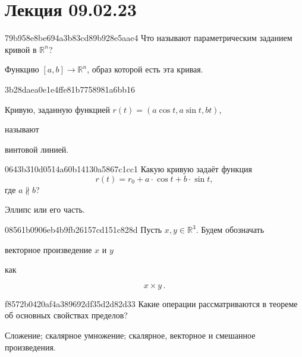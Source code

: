 


\section{Лекция 09.02.23}
\begin{note}{79b958e8be694a3b83cd89b928e5aae4}
    Что называют параметрическим заданием кривой в \({ \mathbb R^{n} }\)?

    \begin{cloze}{1}
        Функцию \({ [a, b] \to \mathbb R^{n} }\), образ которой есть эта кривая.
    \end{cloze}
\end{note}

\begin{note}{3b28daea0e1e4ffe81b7758981a6bb16}
    \begin{icloze}{2}Кривую, заданную функцией \({ r(t) = (a \cos t, a \sin t, bt) }\),\end{icloze} называют \begin{icloze}{1}винтовой линией.\end{icloze}
\end{note}

\begin{note}{0643b310d0514a60b14130a5867c1cc1}
    Какую кривую задаёт функция
    \[
        r(t) = r_0 + a \cdot \cos t + b \cdot \sin t,
    \]
    где \({ a \nparallel b }\)?

    \begin{cloze}{1}
        Эллипс или его часть.
    \end{cloze}
\end{note}

\begin{note}{08561b0906eb4b9fb26157cd151c828d}
    Пусть \({ x, y \in \mathbb R^3 }\).
    Будем обозначать \begin{icloze}{2}векторное произведение \({ x }\) и \({ y }\)\end{icloze} как
    \begin{icloze}{1}
        \[
            x \times y\,.
        \]
    \end{icloze}
\end{note}

\begin{note}{f8572b0420af4a389692df35d2d82d33}
    Какие операции рассматриваются в теореме об основных свойствах пределов?

    \begin{cloze}{1}
        Сложение; скалярное умножение; скалярное, векторное и смешанное произведения.
    \end{cloze}
\end{note}

